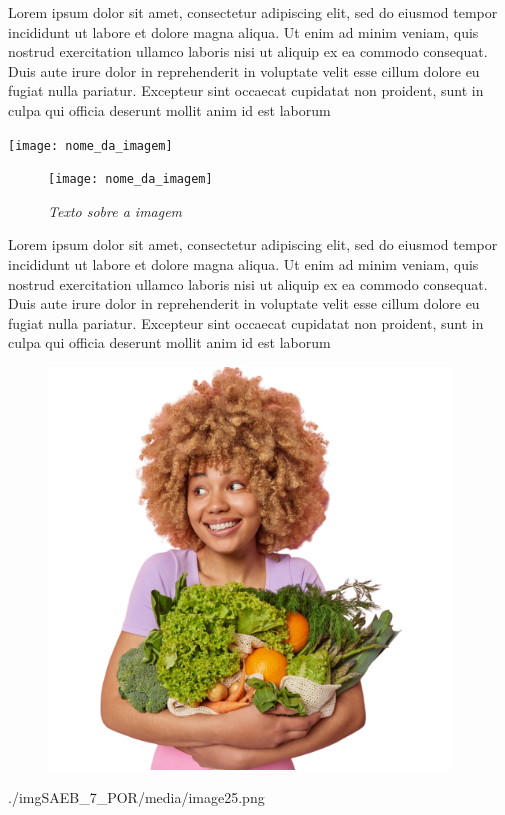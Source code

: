 
\begin{minipage}{0.7\textwidth}
Lorem ipsum dolor sit amet, consectetur adipiscing elit, sed do eiusmod tempor
incididunt ut labore et dolore magna aliqua. Ut enim ad minim veniam, quis
nostrud exercitation ullamco laboris nisi ut aliquip ex ea commodo consequat.
Duis aute irure dolor in reprehenderit in voluptate velit esse cillum dolore
eu fugiat nulla pariatur. Excepteur sint occaecat cupidatat non proident, sunt
in culpa qui officia deserunt mollit anim id est laborum
\end{minipage}
\hfill
\begin{minipage}{0.2\textwidth}
  \centering
  \texttt{[image: nome\_da\_imagem]}
\end{minipage}



\begin{figure}  %
  \centering
  \texttt{[image: nome\_da\_imagem]}
  \caption{\textit{Texto sobre a imagem}}
\end{figure}
Lorem ipsum dolor sit amet, consectetur adipiscing elit, sed do eiusmod tempor
incididunt ut labore et dolore magna aliqua. Ut enim ad minim veniam, quis
nostrud exercitation ullamco laboris nisi ut aliquip ex ea commodo consequat.
Duis aute irure dolor in reprehenderit in voluptate velit esse cillum dolore
eu fugiat nulla pariatur. Excepteur sint occaecat cupidatat non proident, sunt
in culpa qui officia deserunt mollit anim id est laborum


\begin{figure}[H]
\centering
\includegraphics[width=0.95\textwidth]{./imgSAEB_7_POR/media/image25.png}
\end{figure} 

{./imgSAEB_7_POR/media/image25.png}

